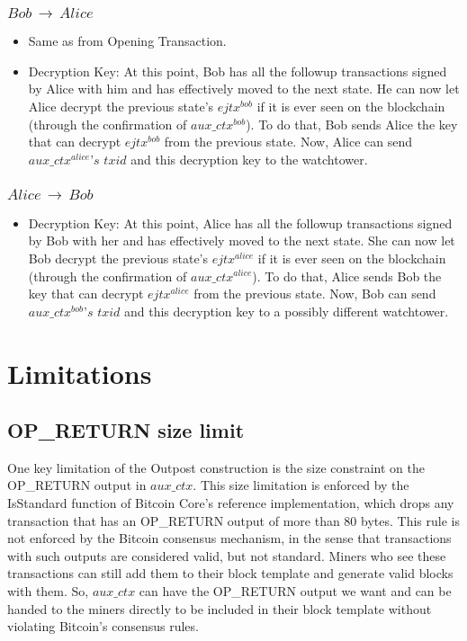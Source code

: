 \subsubsection{$Bob\,\to\,Alice$}
\begin{itemize}[leftmargin=4\parindent]
    \item Same as from Opening Transaction.
    \item Decryption Key: At this point, Bob has all the followup transactions signed by Alice with him and has effectively moved to the next state. He can now let Alice decrypt the previous state's $\mathit{ejtx^{bob}}$ if it is ever seen on the blockchain (through the confirmation of $\mathit{aux\_ctx^{bob}}$). To do that, Bob sends Alice the key that can decrypt $\mathit{ejtx^{bob}}$ from the previous state. Now, Alice can send $\mathit{aux\_ctx^{alice}}$'$s$ $\mathit{txid}$ and this decryption key to the watchtower.
\end{itemize}
\subsubsection{$Alice\,\to\,Bob$}        
\begin{itemize}[leftmargin=4\parindent]
    \item Decryption Key: At this point, Alice has all the followup transactions signed by Bob with her and has effectively moved to the next state. She can now let Bob decrypt the previous state's $\mathit{ejtx^{alice}}$ if it is ever seen on the blockchain (through the confirmation of $\mathit{aux\_ctx^{alice}}$). To do that, Alice sends Bob the key that can decrypt $\mathit{ejtx^{alice}}$ from the previous state. Now, Bob can send $\mathit{aux\_ctx^{bob}}$'$s$ $\mathit{txid}$ and this decryption key to a possibly different watchtower.
\end{itemize}

\section{Limitations}
\subsection{OP\_RETURN size limit}
One key limitation of the Outpost construction is the size constraint on the OP\_RETURN output in $\mathit{aux\_ctx}$. This size limitation is enforced by the IsStandard function of Bitcoin Core's reference implementation, which drops any transaction that has an OP\_RETURN output of more than 80 bytes. This rule is not enforced by the Bitcoin consensus mechanism, in the sense that transactions with such outputs are considered valid, but not standard. Miners who see these transactions can still add them to their block template and generate valid blocks with them. So, $\mathit{aux\_ctx}$ can have the OP\_RETURN output we want and can be handed to the miners directly to be included in their block template without violating Bitcoin's consensus rules. 

